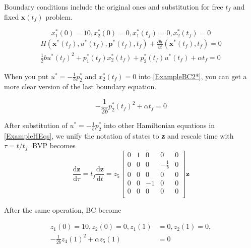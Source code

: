 ﻿\documentclass[twoside]{article}
\begin{document}
Boundary conditions include the original ones and substitution for free $t_f$ and fixed $\textbf{x}(t_f)$ problem.

\begin{equation}\label{ExampleBC1*}
x_1^*(0) = 10, x_2^*(0) = 0, x_1^*(t_f) = 0, x_2^*(t_f) = 0
\end{equation}
\begin{equation}\label{ExampleBC2*}
\begin{split}
H(\textbf{x}^*(t_f), u^*(t_f), \textbf{p}^*(t_f), t_f)+\frac{\partial{h}}{\partial{t}}(\textbf{x}^*(t_f),t_f) = 0 \\
\frac{1}{2}bu^*(t_f)^2 + p_1^*(t_f)x_2^*(t_f)+p_2^*(t_f)u^*(t_f) + \alpha t_f = 0
\end{split}
\end{equation}

When you put $u^* = -\frac{1}{b}p_2^*$ and $x_2^*(t_f) = 0$ into \eqref{ExampleBC2*}, you can get a more clear version of the last boundary equation.

\begin{equation}\label{ExampleBC2*Clear}
-\frac{1}{2b}p_2^*(t_f)^2 + \alpha t_f = 0
\end{equation}

After substitution of $u^* = -\frac{1}{b}p_2^*$ into other Hamiltonian equations in \eqref{ExampleHEqs}, we unify the notation of states to \textbf{z} and rescale time with $\tau = t/t_f$. BVP becomes
\begin{equation}\label{FinalBVP}
\frac{\mathrm{d}\textbf{z}}{\mathrm{d}\tau} = t_f\frac{\mathrm{d}\textbf{z}}{\mathrm{d}t}
= z_5\begin{bmatrix}
    0 & 1 & 0  & 0                & 0 \\
    0 & 0 & 0  & -\frac{1}{b} & 0 \\
    0 & 0 & 0  & 0                & 0 \\
    0 & 0 & -1 & 0                & 0 \\
    0 & 0 & 0  & 0                & 0 \\
\end{bmatrix} \textbf{z}
\end{equation}

After the same operation, BC become

\begin{equation}\label{FinalBC}
\begin{split}
z_1(0) = 10, z_2(0) = 0, z_1(1) &= 0, z_2(1) = 0, \\
-\frac{1}{2b}z_4(1)^2 + \alpha z_5(1) &= 0
\end{split}
\end{equation}
\end{document}
